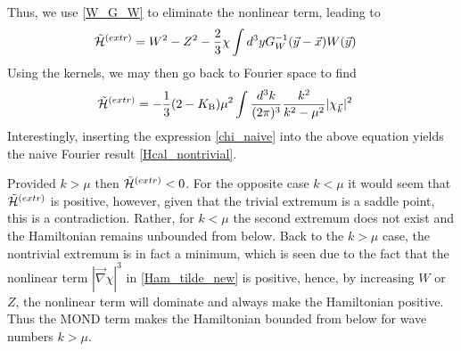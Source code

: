 \documentclass[twocolumn,prd,preprintnumbers,amsmath,amssymb,nofootinbib,superscriptaddress]{revtex4-1}
\newcommand{\grad}{\ensuremath{\vec{\nabla}}}
\newcommand{\Hcal}{{\cal H}}
\newcommand{\KB}{\ensuremath{K_{{\rm B}}}}
\begin{document}
Thus, we use \eqref{W_G_W} to eliminate the nonlinear term, leading to
\begin{align}
\tilde{\Hcal}^{(extr)} &=   W^2 - Z^2 - \frac{2}{3} \chi \int d^3y G^{-1}_W(\vec{y}-\vec{x}) W(\vec{y})
\end{align}
Using the kernels, we may then go back to Fourier space to find
\begin{align}
\tilde{\Hcal}^{(extr)} &= - \frac{1}{3} (2-\KB) \mu^2 \int \frac{d^3k}{(2\pi)^3} \frac{k^2}{k^2 - \mu^2} |\chi_{\vec{k}}|^2
\end{align}
Interestingly, inserting the expression \eqref{chi_naive} into the above equation yields the naive Fourier result \eqref{Hcal_nontrivial}.

Provided $k>\mu$ then $\tilde{\Hcal}^{(extr)} < 0$. For the  opposite case $k < \mu$  it would seem that $\tilde{\Hcal}^{(extr)} $ is positive, however, given that
the trivial extremum is a saddle point, this is a contradiction. Rather, for $k < \mu$ the second
 extremum does not exist and the Hamiltonian remains unbounded from below. Back to
the $k>\mu$ case, the nontrivial extremum is in fact a minimum, which is seen due to the fact that the nonlinear term $|\grad\chi|^3$ in \eqref{Ham_tilde_new}
is positive, hence, by increasing $W$ or $Z$, the nonlinear term will dominate and always make the Hamiltonian positive. Thus the MOND term makes the Hamiltonian bounded from below for wave numbers $k> \mu$.


% 

%
%

\end{document}
